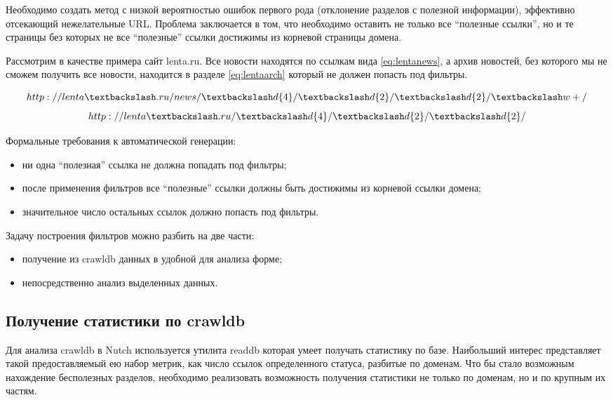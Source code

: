 Необходимо создать метод с низкой вероятностью ошибок первого рода (отклонение разделов с полезной информации), эффективно отсекающий нежелательные URL. Проблема заключается в том, что необходимо оставить не только все ``полезные ссылки'', но и те страницы без которых не все ``полезные'' ссылки достижимы из корневой страницы домена. 

Рассмотрим в качестве примера сайт lenta.ru. Все новости находятся по ссылкам вида \ref{eq:lentanews}, а архив новостей, без которого мы не сможем получить все новости, находится в разделе \ref{eq:lentaarch} который не должен попасть под фильтры.

\begin{equation}\label{eq:lentanews}
http://lenta\textbackslash.ru/news/\textbackslash d\{4\}/\textbackslash d\{2\}/\textbackslash d\{2\}/\textbackslash w+/
\end{equation}
\begin{equation}\label{eq:lentaarch}
 http://lenta\textbackslash.ru/\textbackslash d\{4\}/\textbackslash d\{2\}/\textbackslash d\{2\}/ 
\end{equation}

Формальные требования к автоматической генерации:
\begin{itemize}
 \item ни одна ``полезная'' ссылка  не должна попадать под фильтры;
 \item после применения фильтров все ``полезные'' ссылки должны быть достижимы из корневой ссылки домена;
 \item значительное число остальных ссылок должно попасть под фильтры.
\end{itemize}

Задачу построения фильтров можно разбить на две части:
\begin{itemize}
 \item получение из crawldb данных в удобной для анализа форме;
 \item непосредственно анализ выделенных данных.
\end{itemize}

\subsection{Получение статистики по crawldb}
Для анализа crawldb в Nutch используется утилита readdb которая умеет получать статистику по базе. Наибольший интерес представляет такой предоставляемый ею набор метрик, как число ссылок определенного статуса, разбитые по доменам. Что бы стало возможным нахождение бесполезных разделов, необходимо реализовать возможность получения статистики не только по доменам, но и по крупным их частям.

